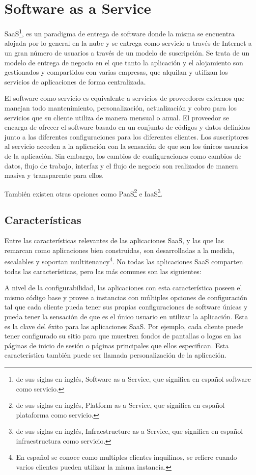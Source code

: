 \section{Software as a Service}
SaaS\footnote{de sus siglas en inglés, Software as a Service, que significa en español software como servicio.}, es un paradigma de entrega de software donde la misma se encuentra alojada por lo general en la nube y se entrega como servicio a través de Internet a un gran número de usuarios a través de un modelo de suscripción. Se trata de un modelo de entrega de negocio en el que tanto la aplicación y el alojamiento son gestionados y compartidos con varias empresas, que alquilan y utilizan los servicios de aplicaciones de forma centralizada\citep{gupta_software_2014}.

El software como servicio es equivalente a servicios de proveedores externos que manejan todo mantenimiento, personalización, actualización y cobro para los servicios que su cliente utiliza de manera mensual o anual. El proveedor se encarga de ofrecer el software basado en un conjunto de códigos y datos definidos junto a las diferentes configuraciones para los diferentes clientes. Los suscriptores al servicio acceden a la aplicación con la sensación de que son los únicos usuarios de la aplicación. Sin embargo, los cambios de configuraciones como cambios de datos, flujo de trabajo, interfaz y el flujo de negocio son realizados de manera masiva y transparente para ellos\citep{kumar_cloud_2012}\citep{kang_web_2012}.

También existen otras opciones como PaaS\footnote{de sus siglas en inglés, Platform as a Service, que significa en español plataforma como servicio.} e IaaS\footnote{de sus siglas en inglés, Infraestructure as a Service, que significa en español infraestructura como servicio.}.

\subsection{Características}
Entre las características relevantes de las aplicaciones SaaS, y las que las remarcan como aplicaciones bien construidas, son desarrolladas a la medida, escalables y soportan multitenancy\footnote{En español se conoce como multiples clientes inquilinos, se refiere cuando varios clientes pueden utilizar la misma instancia.}. No todas las aplicaciones SaaS comparten todas las características, pero las más comunes son las siguientes: 

A nivel de la configurabilidad, las aplicaciones con esta característica poseen el mismo código base y provee a instancias con múltiples opciones de configuración tal que cada cliente pueda tener sus propias configuraciones de software únicas y pueda tener la sensación de que es el único usuario en utilizar la aplicación. Esta es la clave del éxito para las aplicaciones SaaS\citep{jadeja2012cloud}. Por ejemplo, cada cliente puede tener configurado su sitio para que muestren fondos de pantallas o logos en las páginas de inicio de sesión o páginas principales que ellos especifican. Esta característica también puede ser llamada personalización de la aplicación.

